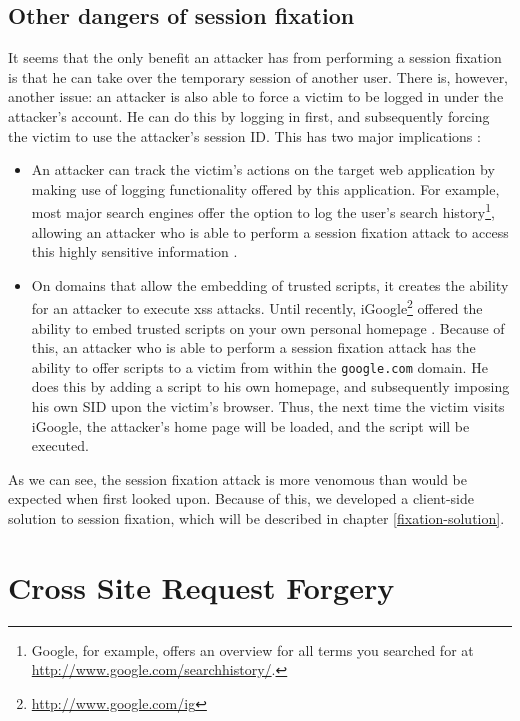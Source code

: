\subsection{Other dangers of session fixation}

It seems that the only benefit an attacker has from performing a session fixation is that he can take over the temporary session of another user. There is, however, another issue: an attacker is also able to force a victim to be logged in under the attacker's account. He can do this by logging in first, and subsequently forcing the victim to use the attacker's session ID. This has two major implications \cite{Barth2008}:
\begin{itemize}
	\item An attacker can track the victim's actions on the target web application by making use of logging functionality offered by this application. For example, most major search engines offer the option to log the user's search history\footnote{Google, for example, offers an overview for all terms you searched for at \url{http://www.google.com/searchhistory/}.}, allowing an attacker who is able to perform a session fixation attack to access this highly sensitive information \cite{Barbaro2006}.
	\item On domains that allow the embedding of trusted scripts, it creates the ability for an attacker to execute \gls{xss} attacks. Until recently, iGoogle\footnote{\url{http://www.google.com/ig}} offered the ability to embed trusted scripts on your own personal homepage \cite{Barth2008}. Because of this, an attacker who is able to perform a session fixation attack has the ability to offer scripts to a victim from within the \texttt{google.com} domain. He does this by adding a script to his own homepage, and subsequently imposing his own SID upon the victim's browser. Thus, the next time the victim visits iGoogle, the attacker's home page will be loaded, and the script will be executed.
\end{itemize}

As we can see, the session fixation attack is more venomous than would be expected when first looked upon. Because of this, we developed a client-side solution to session fixation, which will be described in chapter \ref{fixation-solution}.

\section{Cross Site Request Forgery}\label{csrf}

